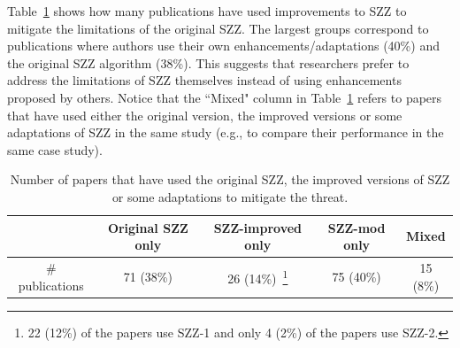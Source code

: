 \documentclass[a4paper, 12pt]{book}
\begin{document}
Table~\ref{tableSZZimproved} shows how many publications have used improvements to SZZ to mitigate the limitations of the original SZZ. The largest groups correspond to publications where authors use their own enhancements/adaptations (40\%) and the original SZZ algorithm (38\%). This suggests that researchers prefer to address the limitations of SZZ themselves instead of using enhancements proposed by others. Notice that the ``Mixed" column in Table~\ref{tableSZZimproved} refers to papers that have used either the original version, the improved versions or some adaptations of SZZ in the same study (e.g., to compare their performance in the same case study).
\begin{table}[!t]
\renewcommand{\arraystretch}{0.8}
\begin{minipage}{\textwidth} 

\caption{Number of papers that have used the original SZZ, the improved versions of SZZ or some adaptations to mitigate the threat.}
\label{tableSZZimproved}
\centering
\begin{tabular}{|c|c|c|c|c|}
\hline
  & Original SZZ only & SZZ-improved only & SZZ-mod only & Mixed  \\
\hline
\hline
\# publications &  71 (38\%) & 26 (14\%)~\footnote{22 (12\%) of the papers use SZZ-1 and only 4 (2\%) of the papers use SZZ-2.} &  75 (40\%)  & 15 (8\%) \\
\hline
\end{tabular}
\end{minipage}
\end{table}
\end{document}
